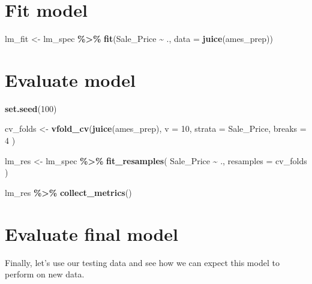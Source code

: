 \documentclass[
]{book}
\newenvironment{Shaded}{\begin{snugshade}}{\end{snugshade}}
\newcommand{\DataTypeTok}[1]{\textcolor[rgb]{0.13,0.29,0.53}{#1}}
\newcommand{\DecValTok}[1]{\textcolor[rgb]{0.00,0.00,0.81}{#1}}
\newcommand{\KeywordTok}[1]{\textcolor[rgb]{0.13,0.29,0.53}{\textbf{#1}}}
\newcommand{\NormalTok}[1]{#1}
\newcommand{\OperatorTok}[1]{\textcolor[rgb]{0.81,0.36,0.00}{\textbf{#1}}}
\newcommand{\StringTok}[1]{\textcolor[rgb]{0.31,0.60,0.02}{#1}}
\begin{document}
\hypertarget{fit-model}{%
\section{Fit model}\label{fit-model}}

\begin{Shaded}
\begin{Highlighting}[]
\NormalTok{lm\_fit \textless{}{-}}
\StringTok{  }\NormalTok{lm\_spec }\OperatorTok{\%\textgreater{}\%}
\StringTok{  }\KeywordTok{fit}\NormalTok{(Sale\_Price }\OperatorTok{\textasciitilde{}}\StringTok{ }\NormalTok{., }\DataTypeTok{data =} \KeywordTok{juice}\NormalTok{(ames\_prep))}
\end{Highlighting}
\end{Shaded}

\hypertarget{evaluate-model-1}{%
\section{Evaluate model}\label{evaluate-model-1}}

\begin{Shaded}
\begin{Highlighting}[]
\KeywordTok{set.seed}\NormalTok{(}\DecValTok{100}\NormalTok{)}

\NormalTok{cv\_folds \textless{}{-}}
\StringTok{  }\KeywordTok{vfold\_cv}\NormalTok{(}\KeywordTok{juice}\NormalTok{(ames\_prep),}
    \DataTypeTok{v =} \DecValTok{10}\NormalTok{,}
    \DataTypeTok{strata =}\NormalTok{ Sale\_Price,}
    \DataTypeTok{breaks =} \DecValTok{4}
\NormalTok{  )}

\NormalTok{lm\_res \textless{}{-}}
\StringTok{  }\NormalTok{lm\_spec }\OperatorTok{\%\textgreater{}\%}
\StringTok{  }\KeywordTok{fit\_resamples}\NormalTok{(}
\NormalTok{    Sale\_Price }\OperatorTok{\textasciitilde{}}\StringTok{ }\NormalTok{.,}
    \DataTypeTok{resamples =}\NormalTok{ cv\_folds}
\NormalTok{  )}

\NormalTok{lm\_res }\OperatorTok{\%\textgreater{}\%}
\StringTok{  }\KeywordTok{collect\_metrics}\NormalTok{()}
\end{Highlighting}
\end{Shaded}

\hypertarget{evaluate-final-model-1}{%
\section{Evaluate final model}\label{evaluate-final-model-1}}

Finally, let's use our testing data and see how we can expect this model to perform on new data.
\end{document}
